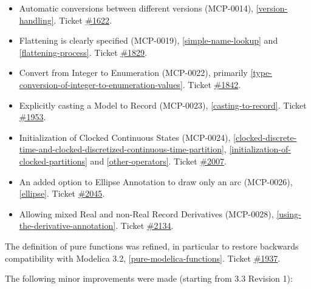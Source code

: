 \documentclass[10pt,a4paper]{report}
\begin{document}
\begin{itemize}
\item
  Automatic conversions between different versions (MCP-0014), 
  \ref{version-handling}. Ticket
  \href{https://trac.modelica.org/Modelica/ticket/1622}{\#1622}.
\item
  Flattening is clearly specified (MCP-0019), \ref{simple-name-lookup} and \ref{flattening-process}.
  Ticket \href{https://trac.modelica.org/Modelica/ticket/1829}{\#1829}.
\item
  Convert from Integer to Enumeration (MCP-0022), primarily 
  \ref{type-conversion-of-integer-to-enumeration-values}. Ticket
  \href{https://trac.modelica.org/Modelica/ticket/1842}{\#1842}.
\item
  Explicitly casting a Model to Record (MCP-0023), \ref{casting-to-record}.
  Ticket \href{https://trac.modelica.org/Modelica/ticket/1953}{\#1953}.
\item
  Initialization of Clocked Continuous States (MCP-0024), 
  \ref{clocked-discrete-time-and-clocked-discretized-continuous-time-partition},
  \ref{initialization-of-clocked-partitions} and \ref{other-operators}. Ticket
  \href{https://trac.modelica.org/Modelica/ticket/2007}{\#2007}.
\item
  An added option to Ellipse Annotation to draw only an arc (MCP-0026),
  \ref{ellipse}. Ticket
  \href{https://trac.modelica.org/Modelica/ticket/2045}{\#2045}.
\item
  Allowing mixed Real and non-Real Record Derivatives (MCP-0028),
  \ref{using-the-derivative-annotation}. Ticket
  \href{https://trac.modelica.org/Modelica/ticket/2134}{\#2134}.
\end{itemize}

The definition of pure functions was refined, in particular to restore
backwards compatibility with Modelica 3.2, \ref{pure-modelica-functions}. Ticket
\href{https://trac.modelica.org/Modelica/ticket/1937}{\#1937}.

The following minor improvements were made (starting from 3.3 Revision
1):
\end{document}
